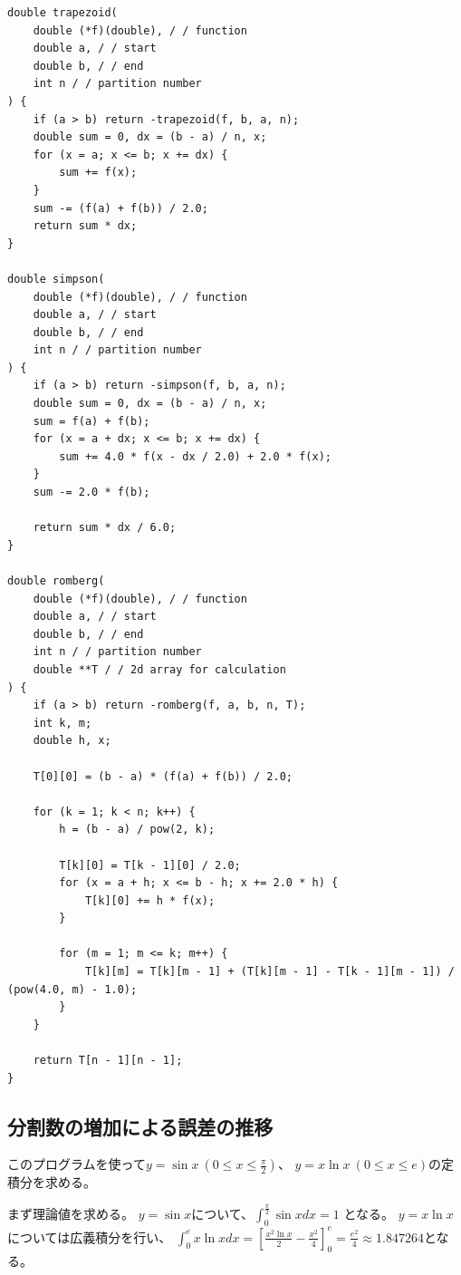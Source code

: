 \documentclass{jsarticle}
\begin{document}
        \begin{lstlisting}[caption=integral.c, label=src:int]
double trapezoid(
    double (*f)(double), / / function
    double a, / / start
    double b, / / end
    int n / / partition number
) {
    if (a > b) return -trapezoid(f, b, a, n);
    double sum = 0, dx = (b - a) / n, x;
    for (x = a; x <= b; x += dx) {
        sum += f(x);
    }
    sum -= (f(a) + f(b)) / 2.0;
    return sum * dx;
}

double simpson(
    double (*f)(double), / / function
    double a, / / start
    double b, / / end
    int n / / partition number
) {
    if (a > b) return -simpson(f, b, a, n);
    double sum = 0, dx = (b - a) / n, x;
    sum = f(a) + f(b);
    for (x = a + dx; x <= b; x += dx) {
        sum += 4.0 * f(x - dx / 2.0) + 2.0 * f(x);
    }
    sum -= 2.0 * f(b);
    
    return sum * dx / 6.0;
}

double romberg(
    double (*f)(double), / / function
    double a, / / start
    double b, / / end
    int n / / partition number
    double **T / / 2d array for calculation
) {
    if (a > b) return -romberg(f, a, b, n, T);
    int k, m;
    double h, x;

    T[0][0] = (b - a) * (f(a) + f(b)) / 2.0;

    for (k = 1; k < n; k++) {
        h = (b - a) / pow(2, k);

        T[k][0] = T[k - 1][0] / 2.0;
        for (x = a + h; x <= b - h; x += 2.0 * h) {
            T[k][0] += h * f(x);
        }

        for (m = 1; m <= k; m++) {
            T[k][m] = T[k][m - 1] + (T[k][m - 1] - T[k - 1][m - 1]) / (pow(4.0, m) - 1.0);
        }
    }

    return T[n - 1][n - 1];
}\end{lstlisting}

    \subsection{分割数の増加による誤差の推移}
        このプログラムを使って$y = \sin x \ (0 \le x \le \displaystyle\frac{\pi}{2})$、
        $y = x \ln x \ (0 \le x \le e)$の定積分を求める。

        まず理論値を求める。
        $y = \sin x$について、$\displaystyle\int_0^{\frac{\pi}{2}} \sin x dx = 1$
        となる。
        $y = x\ln x$については広義積分を行い、
        $\displaystyle\int_0^e x \ln x dx = \left[\frac{x^2\ln x}{2} - \frac{x^2}{4}\right]_0^e = \frac{e^2}{4} \approx 1.847264$となる。
\end{document}
